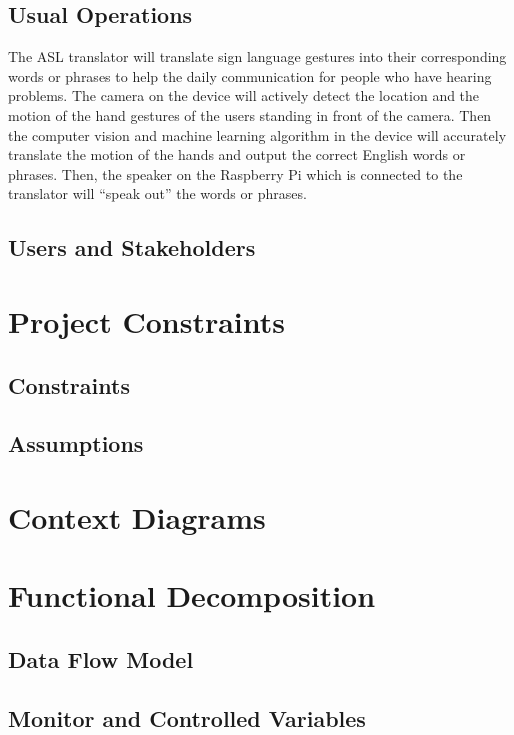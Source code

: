 \documentclass[12pt]{article}
\begin{document}
\subsection{Usual Operations}
The ASL translator will translate sign language gestures into their corresponding words or phrases to help the daily communication for people who have hearing problems. The camera on the device will actively detect the location and the motion of the hand gestures of the users standing in front of the camera. Then the computer vision and machine learning algorithm in the device will accurately translate the motion of the hands and output the correct English words or phrases. Then, the speaker on the Raspberry Pi which is connected to the translator will “speak out” the words or phrases. 

\subsection{Users and Stakeholders}

\section{Project Constraints}
\subsection{Constraints}

\subsection{Assumptions}

\section{Context Diagrams}

\section{Functional Decomposition}
\subsection{Data Flow Model}

\subsection{Monitor and Controlled Variables}
\end{document}

